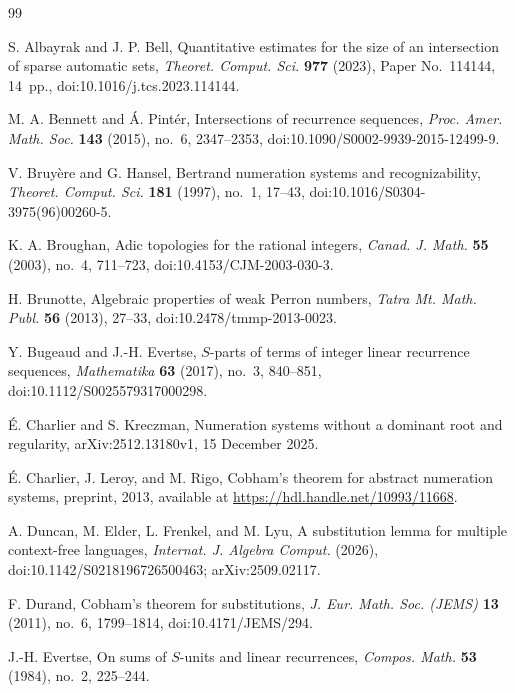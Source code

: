 \begin{thebibliography}{99}

S. Albayrak and J. P. Bell,
Quantitative estimates for the size of an intersection of sparse automatic sets,
\textit{Theoret. Comput. Sci.} \textbf{977} (2023), Paper No.~114144,
14~pp., doi:10.1016/j.tcs.2023.114144.

M. A. Bennett and \'A. Pint\'er,
Intersections of recurrence sequences,
\textit{Proc. Amer. Math. Soc.} \textbf{143} (2015), no.~6, 2347--2353,
doi:10.1090/S0002-9939-2015-12499-9.

V. Bruy{\`e}re and G. Hansel,
Bertrand numeration systems and recognizability,
\textit{Theoret. Comput. Sci.} \textbf{181} (1997), no.~1, 17--43,
doi:10.1016/S0304-3975(96)00260-5.

K. A. Broughan,
Adic topologies for the rational integers,
\textit{Canad. J. Math.} \textbf{55} (2003), no.~4, 711--723,
doi:10.4153/CJM-2003-030-3.

H. Brunotte,
Algebraic properties of weak Perron numbers,
\textit{Tatra Mt. Math. Publ.} \textbf{56} (2013), 27--33,
doi:10.2478/tmmp-2013-0023.

Y. Bugeaud and J.-H. Evertse,
\(S\)-parts of terms of integer linear recurrence sequences,
\textit{Mathematika} \textbf{63} (2017), no.~3, 840--851,
doi:10.1112/S0025579317000298.

\'E. Charlier and S. Kreczman,
Numeration systems without a dominant root and regularity,
arXiv:2512.13180v1, 15 December 2025.

\'E. Charlier, J. Leroy, and M. Rigo,
Cobham's theorem for abstract numeration systems,
preprint, 2013, available at \url{https://hdl.handle.net/10993/11668}.

A. Duncan, M. Elder, L. Frenkel, and M. Lyu,
A substitution lemma for multiple context-free languages,
\textit{Internat. J. Algebra Comput.} (2026),
doi:10.1142/S0218196726500463; arXiv:2509.02117.

F. Durand,
Cobham's theorem for substitutions,
\textit{J. Eur. Math. Soc. (JEMS)} \textbf{13} (2011), no.~6,
1799--1814, doi:10.4171/JEMS/294.

J.-H. Evertse,
On sums of \(S\)-units and linear recurrences,
\textit{Compos. Math.} \textbf{53} (1984), no.~2, 225--244.


\end{thebibliography}
